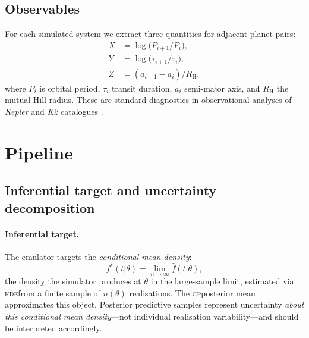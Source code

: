 \documentclass[12pt,a4paper]{article}
\newcommand{\GP}{\textsc{gp}}
\newcommand{\KDE}{\textsc{kde}}
\newcommand{\spar}{\theta}
\begin{document}
\subsection{Observables}
\label{sec:observables}

For each simulated system we extract three quantities for adjacent
planet pairs:
\begin{align}
  X &= \log\!\bigl(P_{i+1}/P_i\bigr), \label{eq:X}\\
  Y &= \log\!\bigl(\tau_{i+1}/\tau_i\bigr), \label{eq:Y}\\
  Z &= (a_{i+1}-a_i)/R_{\mathrm{H}}, \label{eq:Z}
\end{align}
where $P_i$ is orbital period, $\tau_i$ transit duration, $a_i$
semi-major axis, and $R_{\mathrm{H}}$ the mutual Hill radius.  These
are standard diagnostics in observational analyses of \textit{Kepler}
and \textit{K2} catalogues \citep{fabrycky2014, weiss2018, gilbert2020}.

\section{Pipeline}
\label{sec:methods}

\subsection{Inferential target and uncertainty decomposition}
\label{sec:target}

\paragraph{Inferential target.}
The emulator targets the \emph{conditional mean density}:
\begin{equation}
  f^*(t|\spar) = \lim_{n\to\infty}\hat{f}(t|\spar),
  \label{eq:target}
\end{equation}
the density the simulator produces at $\spar$ in the large-sample
limit, estimated via \KDE from a finite sample of $n(\spar)$
realisations.  The \GP posterior mean approximates this object.
Posterior predictive samples represent uncertainty \emph{about this
conditional mean density}---not individual realisation
variability---and should be interpreted accordingly.
\end{document}
